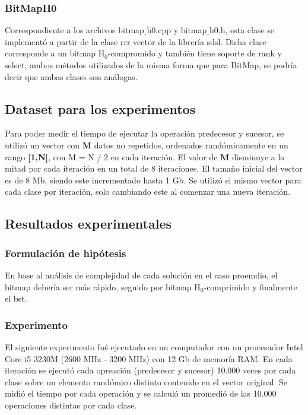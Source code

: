 \documentclass[11pt]{article}
\begin{document}
\subsubsection{BitMapH0}
Correspondiente a los archivos bitmap$\_$h0.cpp y bitmap$\_$h0.h, esta clase se implementó a partir de la clase rrr$\_$vector de la librería sdsl. Dicha clase corresponde a un bitmap H$_{0}$-compromido y también tiene soporte de rank y select, ambos métodos utilizados de la misma forma que para BitMap, se podría decir que ambas clases son análogas.
\subsection{Dataset para los experimentos}
Para poder medir el tiempo de ejecutar la operación predecesor y sucesor, se utilizó un vector con \textbf{M} datos no repetidos, ordenados randómicamente en un rango \textbf{[1,N]}, con M = N / 2 en cada iteración. El valor de \textbf{M} disminuye a la mitad por cada iteración en un total de 8 iteraciones. El tamaño inicial del vector es de 8 Mb, siendo este incrementado hasta 1 Gb. Se utilizó el mismo vector para cada clase por iteración, solo cambiando este al comenzar una nueva iteración.
\subsection{Resultados experimentales}
\subsubsection{Formulación de hipótesis}
En base al análisis de complejidad de cada solución en el caso proemdio, el bitmap debería ser más rápido, seguido por bitmap H$_{0}$-comprimido y finalmente el bst. 
\subsubsection{Experimento}
El siguiente experimento fué ejecutado en un computador con un procesador Intel Core i5 3230M (2600 MHz - 3200 MHz) con 12 Gb de memoría RAM. En cada iteración se ejecutó cada opreación (predecesor y sucesor) 10.000 veces por cada clase sobre un elemento randómico distinto contenido en el vector original. Se midió el tiempo por cada operación y se calculó un promedió de las 10.000 operaciones distintas por cada clase.
\end{document}
